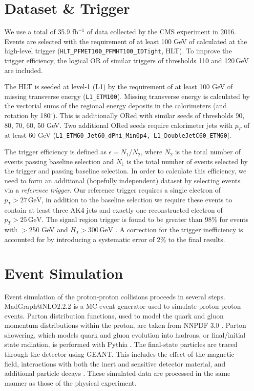 \section{Dataset \& Trigger}

We use a total of 35.9 fb$^{-1}$ of data collected by the CMS experiment in 2016. Events are selected with the requirement of at least 100 GeV of \ptmiss calculated at the high-level trigger (\texttt{HLT\_PFMET100\_PFMHT100\_IDTight}, HLT). To improve the trigger efficiency, the logical OR of similar triggers of thresholds 110 and 120$\,$GeV are included.

The HLT is seeded at level-1 (L1) by the requirement of at least 100 GeV of missing transverse energy (\texttt{L1\_ETM100}). Missing transverse energy is calculated by the vectorial sums of the regional energy deposits in the calorimeters (and rotation by 180$^{\circ}$). This is additionally ORed with similar seeds of thresholds 90, 80, 70, 60, 50 GeV. Two additional ORed seeds require calorimeter jets with $p_{T}$ of at least 60 GeV (\texttt{L1\_ETM60\_Jet60\_dPhi\_Min0p4, L1\_DoubleJetC60\_ETM60}).

The trigger efficiency is defined as $\epsilon = N_{1}/N_{2}$, where $N_{2}$ is the total number of events passing baseline selection and $N_{1}$ is the total number of events selected by the trigger and passing baseline selection. In order to calculate this efficiency, we need to form an additional (hopefully independent) dataset by selecting events via a \textit{reference trigger}. Our reference trigger requires a single electron of $p_{T}>27\,\textrm{GeV}$, in addition to the baseline selection we require these events to contain at least three AK4 jets and exactly one reconstructed electron of $p_{T}>25\,\textrm{GeV}$. The signal region trigger is found to be greater than 98\% for events with \ptmiss$>$250 GeV and $H_{T}>300\,\textrm{GeV}$ \cite{CMS-SUS-16-033}. A correction for the trigger inefficiency is accounted for by introducing a systematic error of 2\% to the final results.

\section{Event Simulation}

Event simulation of the proton-proton collisions proceeds in several steps. MadGraph@NLO2.2.2 \cite{Alwall:2014hca} is a MC event generator used to simulate proton-proton events. Parton distribution functions, used to model the quark and gluon momentum distributions within the proton, are taken from NNPDF 3.0 \cite{Ball:2014uwa}. Parton showering, which models quark and gluon evolution into hadrons, or final/initial state radiation, is performed with Pythia \cite{pythiacite}. The final-state particles are traced through the detector using GEANT. This includes the effect of the magnetic field, interactions with both the inert and sensitive detector material, and additional particle decays \cite{Agostinelli:2002hh}. These simulated data are processed in the same manner as those of the physical experiment.

